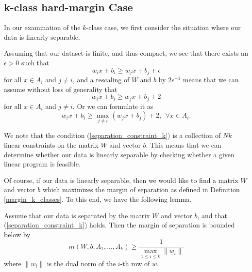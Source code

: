 \subsection{k-class hard-margin Case}
In our examination of the $k$-class case, we first consider the situation where our data is linearly separable.

Assuming that our dataset is finite, and thus compact, we see that there exists an $\epsilon > 0$ such that
\begin{equation}
 w_i x+b_i \geq w_jx+b_j + \epsilon
\end{equation}
for all $x\in A_i$ and $j\neq i$, and a rescaling of $W$ and $b$ by $2\epsilon^{-1}$ means that we can assume without loss of 
generality that
\begin{equation}
 w_i x+b_i \geq w_jx+b_j + 2
\end{equation}
for all $x\in A_i$ and $j\neq i$. Or we can formulate it as
\begin{equation}\label{separation_constraint_k}
w_i x+b_i \geq \max_{j\neq i} (w_jx + b_j) + 2,~~\forall x\in A_i.
\end{equation}


We note that the condition (\ref{separation_constraint_k}) is a collection of $Nk$ linear constraints on the matrix $W$ and
vector $b$. This means that we can determine whether our data is linearly separable by checking whether a given linear
program is feasible.

Of course, if our data is linearly separable, then we would like to find a matrix $W$ and vector $b$ which maximizes the
margin of separation as defined in Definition \ref{margin_k_classes}. To this end, we have the following lemma.
\begin{lemma}
 Assume that our data is separated by the matrix $W$ and vector $b$, and that (\ref{separation_constraint_k}) holds.
 Then the margin of separation is bounded below by
 \begin{equation}
  m(W,b;A_1,...,A_k)\geq \frac{1}{\max_{1\leq i\leq k}\|w_i\|}
 \end{equation}
 where $\|w_i\|$ is the dual norm of the $i$-th row of $w$.
\end{lemma}

